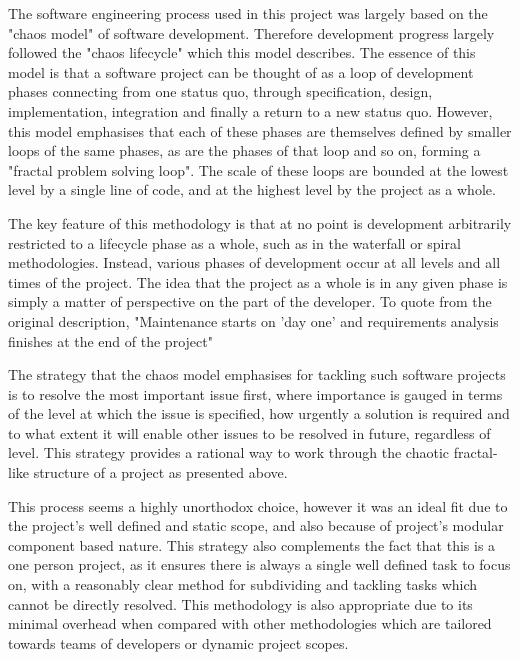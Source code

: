 \documentclass[11pt]{article}
\begin{document}
The software engineering process used in this project was largely based on the "chaos model"\cite{raccoon} of software development. Therefore development progress largely followed the "chaos lifecycle" which this model describes. The essence of this model is that a software project can be thought of as a loop of development phases connecting from one status quo, through specification, design, implementation, integration and finally a return to a new status quo. However, this model emphasises that each of these phases are themselves defined by smaller loops of the same phases, as are the phases of that loop and so on, forming a "fractal problem solving loop". The scale of these loops are bounded at the lowest level by a single line of code, and at the highest level by the project as a whole.

The key feature of this methodology is that at no point is development arbitrarily restricted to a lifecycle phase as a whole, such as in the waterfall or spiral methodologies. Instead, various phases of development occur at all levels and all times of the project. The idea that the project as a whole is in any given phase is simply a matter of perspective on the part of the developer. To quote from the original description, "Maintenance starts on 'day one' and requirements analysis finishes at the end of the project"\cite{raccoon}

The strategy that the chaos model emphasises for tackling such software projects is to resolve the most important issue first, where importance is gauged in terms of the level at which the issue is specified, how urgently a solution is required and to what extent it will enable other issues to be resolved in future, regardless of level. This strategy provides a rational way to work through the chaotic fractal-like structure of a project as presented above.

This process seems a highly unorthodox choice, however it was an ideal fit due to the project's well defined and static scope, and also because of project's modular component based nature. This strategy also complements the fact that this is a one person project, as it ensures there is always a single well defined task to focus on, with a reasonably clear method for subdividing and tackling tasks which cannot be directly resolved. This methodology is also appropriate due to its minimal overhead when compared with other methodologies which are tailored towards teams of developers or dynamic project scopes.
\end{document}
